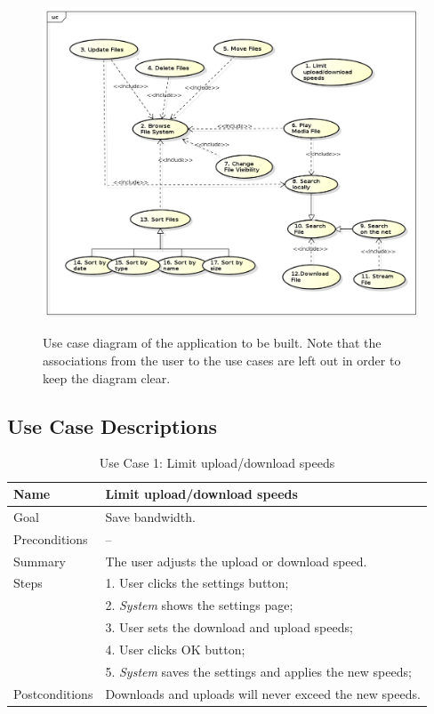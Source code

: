 \begin{center}
\begin{figure}[h]
	\centering
	\mbox{\includegraphics[width=1.2\textwidth]{Images/use_case.png}}
	\label{fig:use_case_diagram}
	\caption{Use case diagram of the application to be built.
	Note that the associations from the user to the use cases are left out in order to keep the diagram clear.}
\end{figure}
\end{center}

\clearpage
\subsection{Use Case Descriptions}
\label{sec:use_case_descriptions}

\begin{table}[h!]
\centering
\begin{tabular}{|l|l|}
\hline
Name & Limit upload/download speeds\\ \hline
Goal & Save bandwidth.\\ \hline
Preconditions & -- \\ \hline
Summary & The user adjusts the upload or download speed.\\ \hline
Steps &  1. User clicks the settings button; \\
      &  2. \textit{System} shows the settings page; \\
      &  3. User sets the download and upload speeds; \\
      &  4. User clicks OK button; \\
      &  5. \textit{System} saves the settings and applies the new speeds;
        \\ \hline
Postconditions & Downloads and uploads will never exceed the new speeds.
\\ \hline
\end{tabular}
\caption{Use Case 1: Limit upload/download speeds}
\label{tab:UC1}
\end{table}

